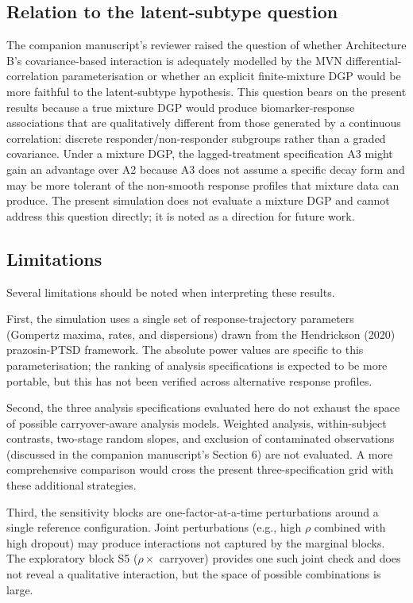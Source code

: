 \documentclass[
]{article}
\begin{document}
\subsection{Relation to the latent-subtype question}\label{relation-to-the-latent-subtype-question}

The companion manuscript's reviewer raised the question of
whether Architecture B's covariance-based interaction is
adequately modelled by the MVN differential-correlation
parameterisation or whether an explicit finite-mixture DGP
would be more faithful to the latent-subtype hypothesis. This
question bears on the present results because a true mixture DGP
would produce biomarker-response associations that are
qualitatively different from those generated by a continuous
correlation: discrete responder/non-responder subgroups rather
than a graded covariance. Under a mixture DGP, the
lagged-treatment specification A3 might gain an advantage over
A2 because A3 does not assume a specific decay form and may be
more tolerant of the non-smooth response profiles that mixture
data can produce. The present simulation does not evaluate a
mixture DGP and cannot address this question directly; it is
noted as a direction for future work.

\subsection{Limitations}\label{limitations}

Several limitations should be noted when interpreting these
results.

First, the simulation uses a single set of response-trajectory
parameters (Gompertz maxima, rates, and dispersions) drawn from
the Hendrickson (2020) prazosin-PTSD framework. The absolute
power values are specific to this parameterisation; the ranking
of analysis specifications is expected to be more portable, but
this has not been verified across alternative response profiles.

Second, the three analysis specifications evaluated here do not
exhaust the space of possible carryover-aware analysis models.
Weighted analysis, within-subject contrasts, two-stage random
slopes, and exclusion of contaminated observations (discussed
in the companion manuscript's Section 6) are not evaluated. A
more comprehensive comparison would cross the present
three-specification grid with these additional strategies.

Third, the sensitivity blocks are one-factor-at-a-time
perturbations around a single reference configuration. Joint
perturbations (e.g., high \(\rho\) combined with high dropout)
may produce interactions not captured by the marginal blocks.
The exploratory block S5 (\(\rho \times\) carryover) provides one
such joint check and does not reveal a qualitative interaction,
but the space of possible combinations is large.
\end{document}
